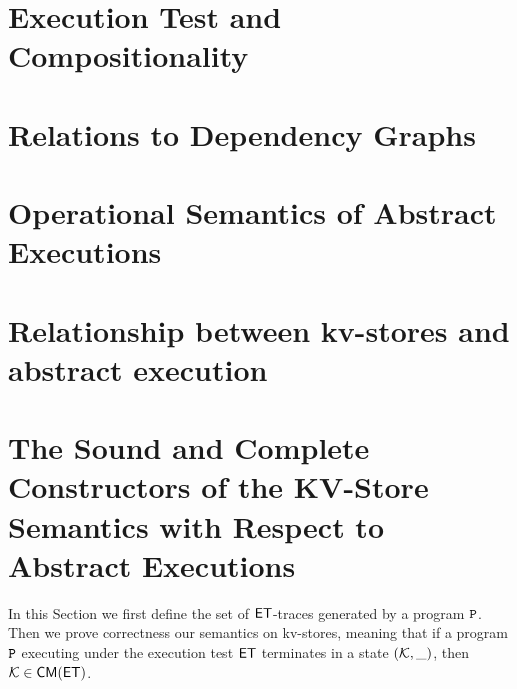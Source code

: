 \documentclass[conference,compsoc]{IEEEtran}
\newcommand{\RootPath}{.}
\begin{document}
\section{Execution Test and Compositionality}
\label{app:compositionality}







\section{Relations to Dependency Graphs}
\label{app:depgraphs}
\label{sec:dependent-graph}

\section{Operational Semantics of Abstract Executions}
\label{sec:abstract-execution}


\section{Relationship between kv-stores and abstract execution}




\section{The Sound and Complete Constructors of the KV-Store Semantics with Respect to Abstract Executions}
\label{sec:kv-sound-complete-proof}
In this Section we first define the set of $\mathsf{ET}$-traces generated by a program $\mathtt{P}$. 
Then we prove correctness our semantics on kv-stores,
meaning that if a program $\mathtt{P}$ executing under the execution 
test $\mathsf{ET}$ terminates in a state $(\mathcal{K}, \_)$, then $\mathcal{K} \in \mathsf{CM}(\mathsf{ET})$. 



\end{document}
